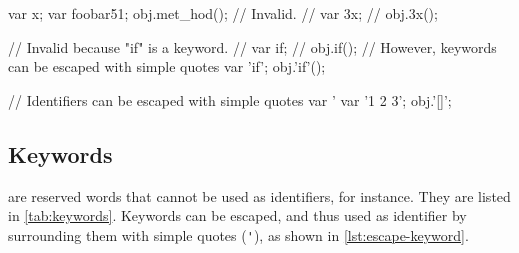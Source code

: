 \begin{urbiscript}[caption=Identifiers,label=lst:identifiers,float=\floatpos]
var x;
var foobar51;
obj.met_hod();
// Invalid.
// var 3x;
// obj.3x();
\end{urbiscript}

\begin{urbiscript}[caption=Identifiers cannot be keywords,
  label=lst:identifiers-keywords,float=\floatpos]
// Invalid because "if" is a keyword.
// var if;
// obj.if();
// However, keywords can be escaped with simple quotes
var 'if';
obj.'if'();
\end{urbiscript}

\begin{urbiscript}[caption=Escaping identifiers with simple quotes,
  label=lst:escape-identifiers,float=\floatpos]
// Identifiers can be escaped with simple quotes
var '%
var '1 2 3';
obj.'[]';
\end{urbiscript}

\subsection{Keywords}
\label{sec:syn-key}

 are reserved words that cannot be used as identifiers,
for instance.  They are listed in \autoref{tab:keywords}.  Keywords
can be escaped, and thus used as identifier by surrounding them with
simple quotes (\lstinline|'|), as shown in
\autoref{lst:escape-keyword}.

